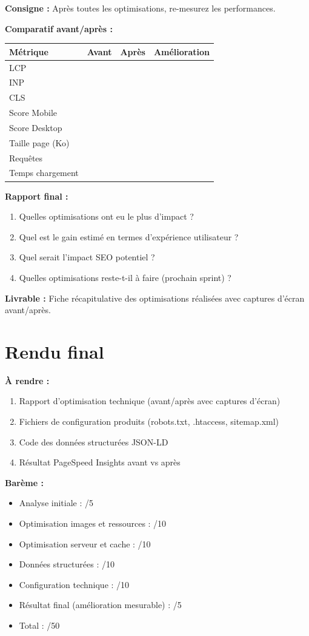 \documentclass[12pt,a4paper]{report}
\begin{document}
\textbf{Consigne :} Après toutes les optimisations, re-mesurez les performances.

\textbf{Comparatif avant/après :}

\begin{tabular}{|l|c|c|c|}
\hline
\textbf{Métrique} & \textbf{Avant} & \textbf{Après} & \textbf{Amélioration} \\
\hline
LCP & & & \\
\hline
INP & & & \\
\hline
CLS & & & \\
\hline
Score Mobile & & & \\
\hline
Score Desktop & & & \\
\hline
Taille page (Ko) & & & \\
\hline
Requêtes & & & \\
\hline
Temps chargement & & & \\
\hline
\end{tabular}

\textbf{Rapport final :}
\begin{enumerate}
\item Quelles optimisations ont eu le plus d'impact ?
\item Quel est le gain estimé en termes d'expérience utilisateur ?
\item Quel serait l'impact SEO potentiel ?
\item Quelles optimisations reste-t-il à faire (prochain sprint) ?
\end{enumerate}

\textbf{Livrable :} Fiche récapitulative des optimisations réalisées avec captures d'écran avant/après.

\section{Rendu final}

\textbf{À rendre :}
\begin{enumerate}
\item Rapport d'optimisation technique (avant/après avec captures d'écran)
\item Fichiers de configuration produits (robots.txt, .htaccess, sitemap.xml)
\item Code des données structurées JSON-LD
\item Résultat PageSpeed Insights avant vs après
\end{enumerate}

\textbf{Barème :}
\begin{itemize}
\item Analyse initiale : /5
\item Optimisation images et ressources : /10
\item Optimisation serveur et cache : /10
\item Données structurées : /10
\item Configuration technique : /10
\item Résultat final (amélioration mesurable) : /5
\item Total : /50
\end{itemize}
\end{document}
